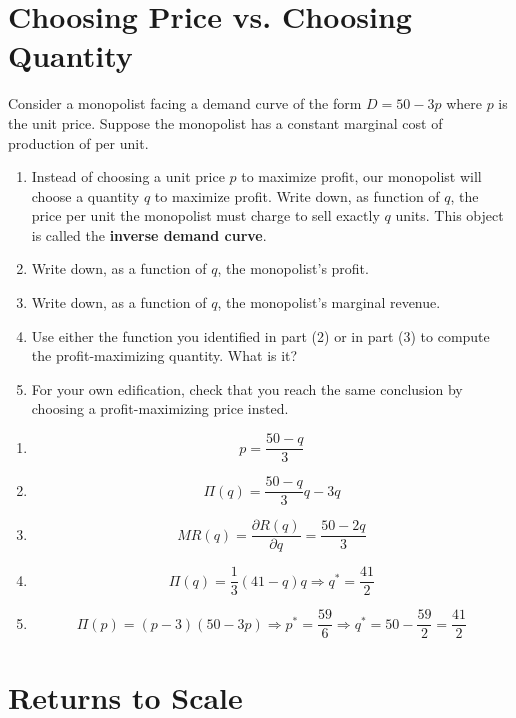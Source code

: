 \documentclass{article}
\newenvironment{solution}{\color{red}}{\color{black}}
\begin{document}
\section*{Choosing Price vs. Choosing Quantity}
Consider a monopolist facing a demand curve of the form $D = 50 - 3p$ where $p$ is the unit price. Suppose the monopolist has a constant marginal cost of production of  per unit.

\begin{enumerate}
\item Instead of choosing a unit price $p$ to maximize profit, our monopolist will choose a quantity $q$ to maximize profit. Write down, as function of $q$, the price per unit the monopolist must charge to sell exactly $q$ units. This object is called the \textbf{inverse demand curve}.
\item Write down, as a function of $q$, the monopolist's profit.
\item Write down, as a function of $q$, the monopolist's marginal revenue.
\item Use either the function you identified in part (2) or in part (3) to compute the profit-maximizing quantity. What is it?
\item For your own edification, check that you reach the same conclusion by choosing a profit-maximizing price insted.
\end{enumerate}

\begin{solution}

\begin{enumerate}
\item \[ p = \frac{50 - q}{3} \]

\item \[ \Pi(q) = \frac{50 - q}{3}q - 3q \]

\item \[ MR(q) = \frac{\partial R(q)}{\partial q} = \frac{50 - 2q}{3} \]

\item \[ \Pi(q) = \frac13 (41 - q)q \Rightarrow q^{*} = \frac{41}2 \]

\item \[ \Pi(p) = (p - 3)(50 - 3p) \Rightarrow p^{*} = \frac{59}6 \Rightarrow q^{*} = 50 - \frac{59}2 = \frac{41}2 \]
\end{enumerate}

\end{solution}

\section*{Returns to Scale}
\end{document}
